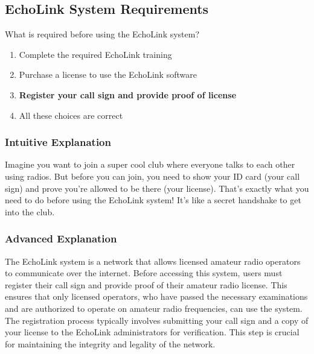 \subsection{EchoLink System Requirements}
\label{T8C10}

\begin{tcolorbox}[colback=gray!10!white,colframe=black!75!black,title=T8C10]
What is required before using the EchoLink system?
\begin{enumerate}[label=\Alph*]
    \item Complete the required EchoLink training
    \item Purchase a license to use the EchoLink software
    \item \textbf{Register your call sign and provide proof of license}
    \item All these choices are correct
\end{enumerate}
\end{tcolorbox}

\subsubsection{Intuitive Explanation}
Imagine you want to join a super cool club where everyone talks to each other using radios. But before you can join, you need to show your ID card (your call sign) and prove you’re allowed to be there (your license). That’s exactly what you need to do before using the EchoLink system! It’s like a secret handshake to get into the club.

\subsubsection{Advanced Explanation}
The EchoLink system is a network that allows licensed amateur radio operators to communicate over the internet. Before accessing this system, users must register their call sign and provide proof of their amateur radio license. This ensures that only licensed operators, who have passed the necessary examinations and are authorized to operate on amateur radio frequencies, can use the system. The registration process typically involves submitting your call sign and a copy of your license to the EchoLink administrators for verification. This step is crucial for maintaining the integrity and legality of the network.

